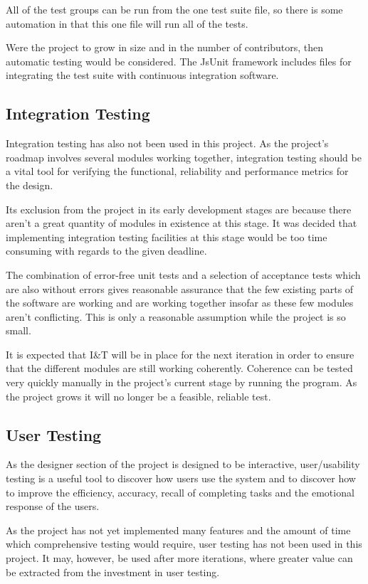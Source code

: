 All of the test groups can be run from the one test suite file, so there is some automation in that this one file will run all of the tests.

Were the project to grow in size and in the number of contributors, then automatic testing would be considered. The JsUnit framework includes files for integrating the test suite with continuous integration software.

\subsection{Integration Testing}
Integration testing has also not been used in this project. As the project's roadmap involves several modules working together, integration testing should be a vital tool for verifying the functional, reliability and performance metrics for the design.

Its exclusion from the project in its early development stages are because there aren't a great quantity of modules in existence at this stage. It was decided that implementing integration testing facilities at this stage would be too time consuming with regards to the given deadline.

The combination of error-free unit tests and a selection of acceptance tests which are also without errors gives reasonable assurance that the few existing parts of the software are working and are working together insofar as these few modules aren't conflicting. This is only a reasonable assumption while the project is so small.

It is expected that I\&T will be in place for the next iteration in order to ensure that the different modules are still working coherently. Coherence can be tested very quickly manually in the project's current stage by running the program. As the project grows it will no longer be a feasible, reliable test.

\subsection{User Testing}
As the designer section of the project is designed to be interactive, user\slash usability testing is a useful tool to discover how users use the system and to discover how to improve the efficiency, accuracy, recall of completing tasks and the emotional response of the users.

As the project has not yet implemented many features and the amount of time which comprehensive testing would require, user testing has not been used in this project. It may, however, be used after more iterations, where greater value can be extracted from the investment in user testing.


